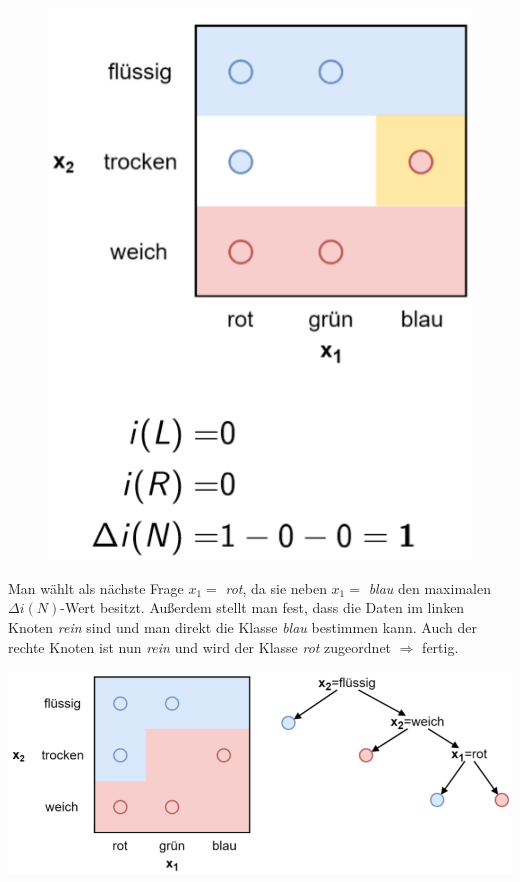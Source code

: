 \documentclass{report}
\begin{document}
\begin{figure}[H]
\begin{minipage}[b]{0.4\textwidth}
  \end{minipage}
\end{figure}

\begin{figure}[H]
  \centering
  \begin{minipage}[b]{0.4\textwidth}
    \includegraphics[scale=.235]{ml07_23}
  \end{minipage}
\end{figure}

Man wählt als nächste Frage $x_1 = $ \textit{rot}, da sie neben $x_1 = $ \textit{blau} den maximalen
$\Delta i(N)$-Wert besitzt. Außerdem stellt man fest, dass die Daten im linken Knoten \textit{rein}
sind und man direkt die Klasse \textit{blau} bestimmen kann. Auch der rechte Knoten ist nun \textit{rein}
und wird der Klasse \textit{rot} zugeordnet $\Rightarrow$ fertig.

\begin{center}
  \includegraphics[scale=.3]{ml07_24}
\end{center}
\end{document}

